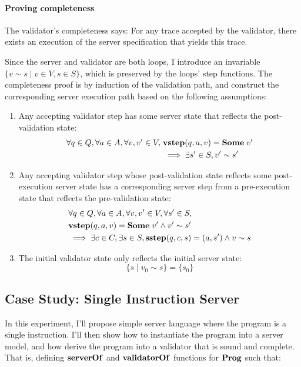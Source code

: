 \documentclass{article}
\theoremstyle{definition}
\newcommand{\sstep}{\ottkw{sstep}}
\newcommand{\vstep}{\ottkw{vstep}}
\newcommand{\Some}[1]{\ottkw{Some}\;#1}
\newcommand{\Prog}{\ottkw{Prog}}
\newcommand{\serverOf}{\ottkw{serverOf}}
\newcommand{\validatorOf}{\ottkw{validatorOf}}
\newcommand{\Reflects}[2]{#1\sim #2}
\begin{document}
\paragraph{Proving completeness}
The validator's completeness says: For any trace accepted by the validator,
there exists an execution of the server specification that yields this trace.

Since the server and validator are both loops, I introduce an invariable
$\{\Reflects{v}{s}\mid v\in V,s\in S\}$, which is preserved by the loops' step
functions.  The completeness proof is by induction of the validation path, and
construct the corresponding server execution path based on the following
assumptions:

\begin{enumerate}
\item Any accepting validator step has some server state that reflects the
  post-validation state:
  \begin{align*}
    \forall q\in Q,\forall a\in A,\forall v, v'\in V,\;&\vstep(q,a,v)=\Some{v'}\\
    &\implies\exists s'\in S,\Reflects{v'}{s'} 
  \end{align*}
\item Any accepting validator step whose post-validation state reflects some
  post-execution server state has a corresponding server step from a
  pre-execution state that reflects the pre-validation state:
  \begin{align*}
    &\forall q\in Q,\forall a\in A,\forall v,v'\in V,\forall s'\in S,\\
    &\vstep(q,a,v)=\Some{v'}\wedge\Reflects{v'}{s'}\\
    &\implies\exists c\in C,\exists s\in S,\sstep(q,c,s)=(a,s')\wedge\Reflects{v}{s}
  \end{align*}
\item The initial validator state only reflects the initial server state:
  \[\{s\mid\Reflects{v_0}{s}\}=\{s_0\}\]
\end{enumerate}

\subsection{Case Study: Single Instruction Server}
\label{sec:opserver}

In this experiment, I'll propose simple server language where the program is a
single instruction.  I'll then show how to instantiate the program into a server
model, and how derive the program into a validator that is sound and complete.
That is, defining $\serverOf$ and $\validatorOf$ functions for $\Prog$ such
that:
\end{document}
